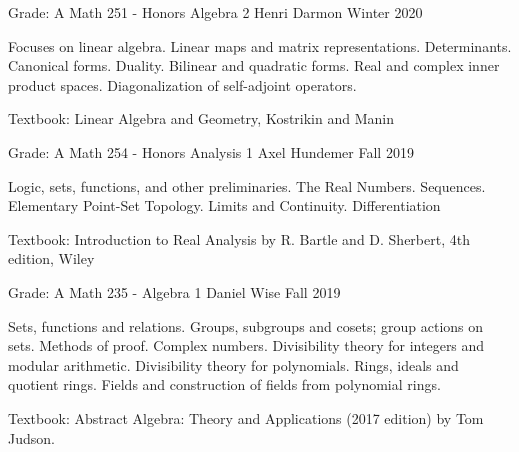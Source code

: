 \begin{cventries}
    \cventry
    {Grade: A} %
    {Math 251 - Honors Algebra 2} %
    {Henri Darmon} %
    {Winter 2020} %
    {
      \begin{cvitems} %
      \item {Focuses on linear algebra. Linear maps and matrix representations. Determinants. Canonical forms. Duality. Bilinear and quadratic forms. Real and complex inner product spaces. Diagonalization of self-adjoint operators.}
      \item {Textbook: Linear Algebra and Geometry, Kostrikin and Manin}
      \end{cvitems}
    }


    \cventry
    {Grade: A} %
    {Math 254 - Honors Analysis 1} %
    {Axel Hundemer} %
    {Fall 2019} %
    {
      \begin{cvitems} %
      \item {Logic, sets, functions, and other preliminaries. The Real Numbers. Sequences. Elementary Point-Set Topology. Limits and Continuity. Differentiation}
      \item {Textbook: Introduction to Real Analysis by R. Bartle and D. Sherbert, 4th edition, Wiley}
      \end{cvitems}
    }


    \cventry
    {Grade: A} %
    {Math 235 - Algebra 1} %
    {Daniel Wise } %
    {Fall 2019} %
    {
      \begin{cvitems} %
      \item {Sets, functions and relations. Groups, subgroups and cosets; group actions on sets. Methods of proof. Complex numbers. Divisibility theory for integers and modular arithmetic. Divisibility theory for polynomials. Rings, ideals and quotient rings. Fields and construction of fields from polynomial rings. }
      \item {Textbook: Abstract Algebra: Theory and Applications (2017 edition) by Tom Judson.}
      \end{cvitems}
    }



\end{cventries}
